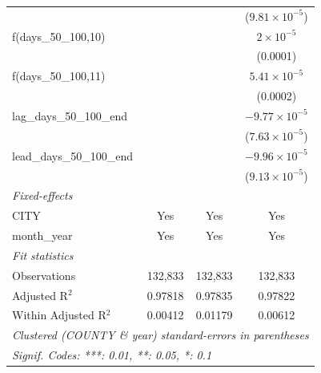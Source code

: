 \begin{tabular}{lccc}
                                    &          &                       & ($9.81\times 10^{-5}$)\\    
   f(days\_50\_100,10)              &          &                       & $2\times 10^{-5}$\\    
                                    &          &                       & (0.0001)\\   
   f(days\_50\_100,11)              &          &                       & $5.41\times 10^{-5}$\\    
                                    &          &                       & (0.0002)\\   
   lag\_days\_50\_100\_end          &          &                       & $-9.77\times 10^{-5}$\\    
                                    &          &                       & ($7.63\times 10^{-5}$)\\    
   lead\_days\_50\_100\_end         &          &                       & $-9.96\times 10^{-5}$\\    
                                    &          &                       & ($9.13\times 10^{-5}$)\\    
   \midrule
   \emph{Fixed-effects}\\
   CITY                             & Yes      & Yes                   & Yes\\  
   month\_year                      & Yes      & Yes                   & Yes\\  
   \midrule
   \emph{Fit statistics}\\
   Observations                     & 132,833  & 132,833               & 132,833\\  
   Adjusted R$^2$                   & 0.97818  & 0.97835               & 0.97822\\  
   Within Adjusted R$^2$            & 0.00412  & 0.01179               & 0.00612\\  
   \midrule \midrule
   \multicolumn{4}{l}{\emph{Clustered (COUNTY \& year) standard-errors in parentheses}}\\
   \multicolumn{4}{l}{\emph{Signif. Codes: ***: 0.01, **: 0.05, *: 0.1}}\\
\end{tabular}
\par\endgroup



